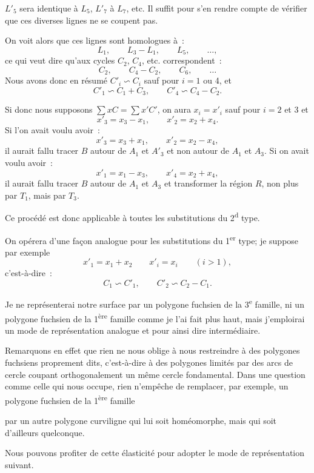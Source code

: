 \documentclass{article}
\begin{document}
$L'_{5}$ sera identique à $L_{5}$, $L'_{7}$ à $L_{7}$, etc. Il suffit pour s'en rendre compte de vérifier que ces diverses lignes ne se coupent pas.

On voit alors que ces lignes sont homologues à~:
\[ L_{1}, \qquad L_{3} - L_{1}, \qquad L_{5}, \qquad \ldots, \]
ce qui veut dire qu'aux cycles $C_{2}$, $C_{4}$, etc. correspondent~:
\[ C_{2}, \qquad C_{4} - C_{2}, \qquad C_{6}, \qquad \ldots \]
Nous avons donc en résumé $C'_{i} \backsim C_{i}$ sauf pour $i = 1$ ou 4, et
\[ C'_{1} \backsim C_{1} + C_{3}, \qquad C'_{4} \backsim C_{4} - C_{2}. \]

Si donc nous supposons $\displaystyle\sum x C = \displaystyle\sum x' C'$, on aura $x_{i} = x'_{i}$ sauf pour $i = 2$ et 3 et
\[ x'_{3} = x_{3} - x_{1}, \qquad x'_{2} = x_{2} + x_{4}. \]
Si l'on avait voulu avoir~:
\[ x'_{3} = x_{3} + x_{1}, \qquad x'_{2} = x_{2} - x_{4}, \]
il aurait fallu tracer $B$ autour de $A_{1}$ et $A'_{3}$ et non autour de $A_{1}$ et $A_{3}$. Si on avait voulu avoir~:
\[ x'_{1} = x_{1} - x_{3}, \qquad x'_{4} = x_{2} + x_{4}, \]
il aurait fallu tracer $B$ autour de $A_{1}$ et $A_{3}$ et transformer la région $R$, non plus par $T_{1}$, mais par $T_{3}$.

Ce procédé est donc applicable à toutes les substitutions du 2\textsuperscript{d} type.

On opérera d'une façon analogue pour les substitutions du 1\textsuperscript{er} type; je suppose par exemple
\[ x'_{1} = x_{1} + x_{2} \qquad x'_{i} = x_{i} \qquad (i > 1), \]
c'est-à-dire~:
\[ C_{1} \backsim C'_{1}, \qquad C'_{2} \backsim C_{2} - C_{1}. \]

Je ne représenterai notre surface par un polygone fuchsien de la 3\textsuperscript{e} famille, ni un polygone fuchsien de la 1\textsuperscript{ère} famille comme je l'ai fait plus haut, mais j'emploirai un mode de représentation analogue et pour ainsi dire intermédiaire.

Remarquons en effet que rien ne nous oblige à nous restreindre à des polygones fuchsiens proprement dits, c'est-à-dire à des polygones limités par des arcs de cercle coupant orthogonalement un même cercle fondamental. Dans une question comme celle qui nous occupe, rien n'empêche de remplacer, par exemple, un polygone fuchsien de la 1\textsuperscript{ère} famille

par un autre polygone curviligne qui lui soit homéomorphe, mais qui soit d'ailleurs quelconque.

Nous pouvons profiter de cette élasticité pour adopter le mode de représentation suivant.
\end{document}
